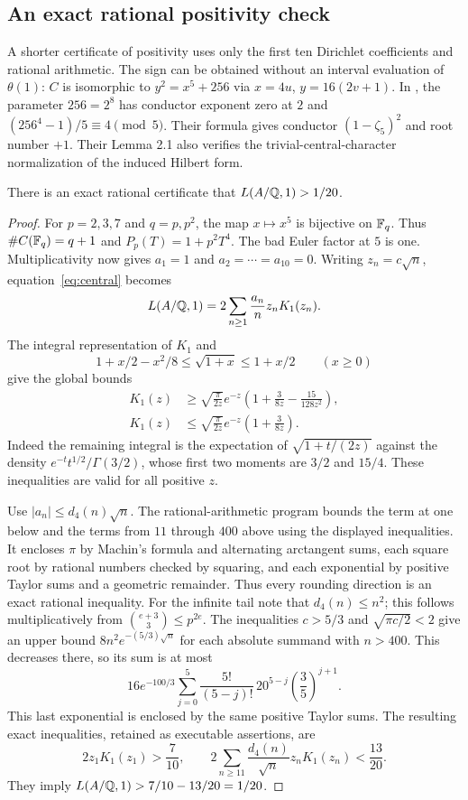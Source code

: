 \subsection{An exact rational positivity check}

A shorter certificate of positivity uses only the first ten
Dirichlet coefficients and rational arithmetic. The sign can be
obtained without an interval evaluation of $\theta(1)$:
$C$ is isomorphic to $y^2=x^5+256$ via
$x=4u$, $y=16(2v+1)$. In
\citet[Proposition 2.2(4)--(6)]{StollYang2003}, the parameter $256=2^8$
has conductor exponent zero at $2$ and
$(256^4-1)/5\equiv4\pmod5$. Their formula gives conductor
$(1-\zeta_5)^2$ and root number $+1$.
Their Lemma 2.1 also verifies the trivial-central-character
normalization of the induced Hilbert form.

\begin{proposition}\label{prop:rationalpositive}
There is an exact rational certificate that $L(A/\mathbb Q,1)>1/20$.
\end{proposition}
\begin{proof}
For $p=2,3,7$ and $q=p,p^2$, the map $x\mapsto x^5$ is bijective
on $\mathbb F_q$. Thus $\#C(\mathbb F_q)=q+1$ and $P_p(T)=1+p^2T^4$.
The bad Euler factor at $5$ is one. Multiplicativity now gives
$a_1=1$ and $a_2=\cdots=a_{10}=0$.
Writing $z_n=c\sqrt n$, equation~\eqref{eq:central} becomes
\[
L(A/\mathbb Q,1)=2\sum_{n\geq1}\frac{a_n}{n}z_nK_1(z_n).
\]
The integral representation of $K_1$ and
\[
1+x/2-x^2/8\leq\sqrt{1+x}\leq1+x/2\qquad(x\geq0)
\]
give the global bounds
\[
\begin{split}
K_1(z)&\geq\sqrt{\frac\pi{2z}}e^{-z}
             \left(1+\frac3{8z}-\frac{15}{128z^2}\right),\\
K_1(z)&\leq\sqrt{\frac\pi{2z}}e^{-z}
             \left(1+\frac3{8z}\right).
\end{split}
\]
Indeed the remaining integral is the expectation of
$\sqrt{1+t/(2z)}$ against the density
$e^{-t}t^{1/2}/\Gamma(3/2)$, whose first two moments are $3/2$ and
$15/4$. These inequalities are valid for all positive $z$.

Use $|a_n|\leq d_4(n)\sqrt n$. The rational-arithmetic program
bounds the term at one below and the terms from $11$ through $400$
above using the displayed inequalities. It encloses $\pi$ by
Machin's formula and alternating arctangent sums, each square root
by rational numbers checked by squaring, and each exponential by
positive Taylor sums and a geometric remainder. Thus every
rounding direction is an exact rational inequality.
For the infinite tail note that $d_4(n)\leq n^2$; this follows
multiplicatively from $\binom{e+3}{3}\leq p^{2e}$.
The inequalities $c>5/3$ and $\sqrt{\pi c/2}<2$ give an upper
bound $8n^2e^{-(5/3)\sqrt n}$ for each absolute summand with $n>400$.
This decreases there, so its sum is at most
\[
16e^{-100/3}\sum_{j=0}^{5}
 \frac{5!}{(5-j)!}\,20^{5-j}\left(\frac35\right)^{j+1}.
\]
This last exponential is enclosed by the same positive Taylor sums.
The resulting exact inequalities, retained as executable assertions,
are
\[
2z_1K_1(z_1)>\frac7{10},\qquad
2\sum_{n\geq11}\frac{d_4(n)}{\sqrt n}z_nK_1(z_n)<\frac{13}{20}.
\]
They imply $L(A/\mathbb Q,1)>7/10-13/20=1/20$.
\end{proof}
